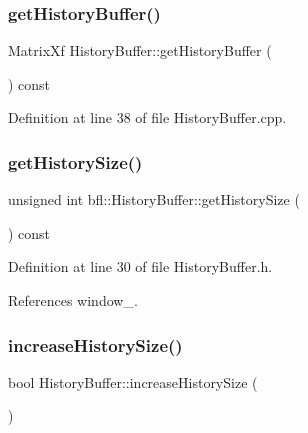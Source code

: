 \subsubsection{\texorpdfstring{get\+History\+Buffer()}{getHistoryBuffer()}}
{\footnotesize\ttfamily Matrix\+Xf History\+Buffer\+::get\+History\+Buffer (\begin{DoxyParamCaption}{ }\end{DoxyParamCaption}) const}



Definition at line 38 of file History\+Buffer.\+cpp.

\mbox{\label{classbfl_1_1HistoryBuffer_a0fef292d6e577b8f2f7d2035927edddb}} 
\subsubsection{\texorpdfstring{get\+History\+Size()}{getHistorySize()}}
{\footnotesize\ttfamily unsigned int bfl\+::\+History\+Buffer\+::get\+History\+Size (\begin{DoxyParamCaption}{ }\end{DoxyParamCaption}) const\hspace{0.3cm}{\ttfamily [inline]}}



Definition at line 30 of file History\+Buffer.\+h.



References window\+\_\+.

\mbox{\label{classbfl_1_1HistoryBuffer_a495d4786a46ffe6da00179f412d44f93}} 
\subsubsection{\texorpdfstring{increase\+History\+Size()}{increaseHistorySize()}}
{\footnotesize\ttfamily bool History\+Buffer\+::increase\+History\+Size (\begin{DoxyParamCaption}{ }\end{DoxyParamCaption})}



